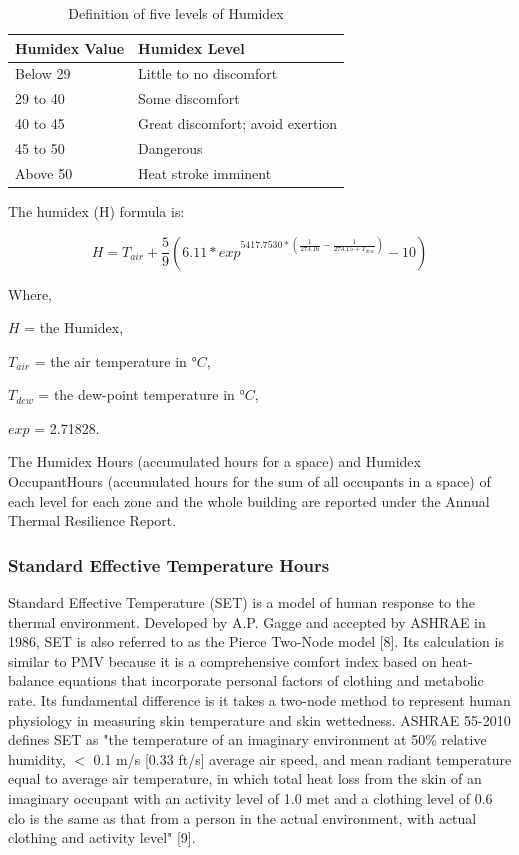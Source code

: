\begin{table}
\centering
\caption{Definition of five levels of Humidex \protect \label{table:humidex-chart}} \tabularnewline
\begin{tabular}{ |p{1in}|p{3in}|  }
\hline
      \textbf{Humidex Value} & \textbf{Humidex Level} \\ \hline
      Below 29 & Little to no discomfort \\ \hline
      29 to 40 & Some discomfort \\ \hline
      40 to 45 & Great discomfort; avoid exertion \\ \hline
      45 to 50 & Dangerous \\ \hline
      Above 50 & Heat stroke imminent \\ \hline
\end{tabular}
\end{table}

The humidex (H) formula is:

\begin{equation}  \label{eq:rm-5}
H = T_{air} + \frac{5}{9}(6.11 * exp^{5417.7530 * (\frac{1}{273.16} - \frac{1}{273.15 + T_{dew}})} - 10)
\end{equation}

Where,

$H$ = the Humidex,

$T_{air}$ = the air temperature in $°C$,

$T_{dew}$ = the dew-point temperature in $°C$,

$exp$ = 2.71828.

The Humidex Hours (accumulated hours for a space) and Humidex OccupantHours (accumulated hours for the sum of all occupants in a space) of each level for each zone and the whole building are reported under the Annual Thermal Resilience Report.

\subsubsection{Standard Effective Temperature Hours}\label{set-hour}
Standard Effective Temperature (SET) is a model of human response to the thermal environment. Developed by A.P. Gagge and accepted by ASHRAE in 1986, SET is also referred to as the Pierce Two-Node model [8]. Its calculation is similar to PMV because it is a comprehensive comfort index based on heat-balance equations that incorporate personal factors of clothing and metabolic rate. Its fundamental difference is it takes a two-node method to represent human physiology in measuring skin temperature and skin wettedness. ASHRAE 55-2010 defines SET as "the temperature of an imaginary environment at 50\% relative humidity, $<$ 0.1 m/s [0.33 ft/s] average air speed, and mean radiant temperature equal to average air temperature, in which total heat loss from the skin of an imaginary occupant with an activity level of 1.0 met and a clothing level of 0.6 clo is the same as that from a person in the actual environment, with actual clothing and activity level" [9].

